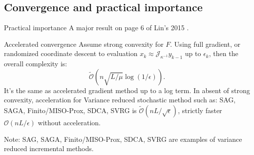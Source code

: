 \documentclass[11pt]{beamer}
\begin{document}
        \subsection{Convergence and practical importance}
            \begin{frame}{Practical importance}
                A major result on page 6 of Lin's 2015 \cite{lin_universal_2015}. 
                \begin{block}{Accelerated convergence}
                    Assume strong convexity for $F$. 
                    Using full gradient, or randomized coordinate descent to evaluation $x_k \approx \mathcal J_{\kappa^{-1}}y_{k - 1}$ up to $\epsilon_k$, then the overall complexity is:
                    $$
                        \widetilde{\mathcal O}\left(n \sqrt{L/\mu} \log(1/\epsilon)\right). 
                    $$
                    It's the same as accelerated gradient method up to a log term. 
                    In absent of strong convexity, acceleration for Variance reduced stochastic method such as: SAG, SAGA, Finito/MISO-Prox, SDCA, SVRG is $\widetilde {\mathcal O}(n L/\sqrt{\epsilon})$, strictly faster $\mathcal O(nL/\epsilon)$ without acceleration. 
                \end{block}
                Note: SAG, SAGA, Finito/MISO-Prox, SDCA, SVRG are examples of variance reduced incremental methods. 
            \end{frame}
\end{document}
